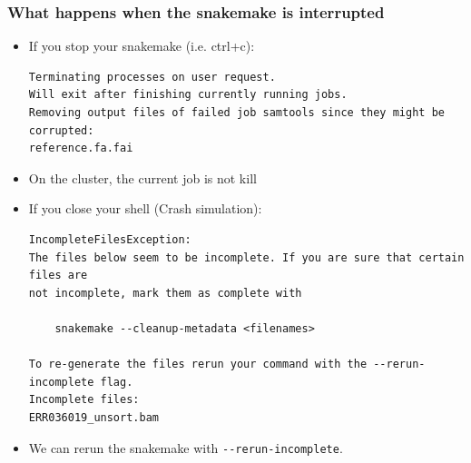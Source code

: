 \documentclass{beamer}
\begin{document}
 


\begin{frame}[fragile]
    \frametitle{What happens when the snakemake is interrupted}
    \begin{itemize}
        \item If you stop your snakemake (i.e. ctrl+c):
        \begin{lstlisting}[language={}]
Terminating processes on user request.
Will exit after finishing currently running jobs.
Removing output files of failed job samtools since they might be corrupted:
reference.fa.fai
        \end{lstlisting}
        \item On the cluster, the current job is not kill
        \item If you close your shell (Crash simulation):
        \begin{lstlisting}[language={}]
IncompleteFilesException:
The files below seem to be incomplete. If you are sure that certain files are 
not incomplete, mark them as complete with

    snakemake --cleanup-metadata <filenames>

To re-generate the files rerun your command with the --rerun-incomplete flag.
Incomplete files:
ERR036019_unsort.bam
        \end{lstlisting}
        \item We can rerun the snakemake with \lstinline[basicstyle=\small\ttfamily]{--rerun-incomplete}.
    \end{itemize}
\end{frame}
\end{document}
